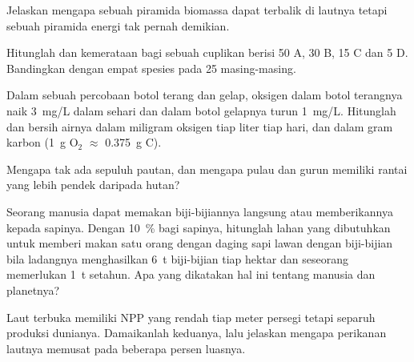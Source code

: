 \begin{exercise}[$\star\star$]\label{exo:b1:ecosystem-organization:6}
Jelaskan mengapa sebuah piramida biomassa dapat terbalik di lautnya
tetapi sebuah piramida energi tak pernah demikian.
\end{exercise}

\begin{exercise}[$\star\star$]\label{exo:b1:ecosystem-organization:7}
Hitunglah  dan kemerataan bagi sebuah cuplikan berisi 50
A, 30 B, 15 C dan 5 D. Bandingkan dengan empat spesies pada 25
masing-masing.
\end{exercise}

\begin{exercise}[$\star\star$]\label{exo:b1:ecosystem-organization:8}
Dalam sebuah percobaan botol terang dan gelap, oksigen dalam botol
terangnya naik \qty{3}{mg/L} dalam sehari dan dalam botol gelapnya
turun \qty{1}{mg/L}. Hitunglah  dan bersih airnya
dalam miligram oksigen tiap liter tiap hari, dan dalam gram karbon
(\qty{1}{g} $\mathrm{O_2}$ $\approx$ \qty{0.375}{g} C).
\end{exercise}

\begin{exercise}[$\star\star$]\label{exo:b1:ecosystem-organization:9}
Mengapa tak ada  sepuluh pautan, dan mengapa pulau dan
gurun memiliki rantai yang lebih pendek daripada hutan?
\end{exercise}

\begin{exercise}[$\star\star\star$]\label{exo:b1:ecosystem-organization:10}
Seorang manusia dapat memakan biji-bijiannya langsung atau
memberikannya kepada sapinya. Dengan  \qty{10}{\%} bagi
sapinya, hitunglah lahan yang dibutuhkan untuk memberi makan satu orang
dengan daging sapi lawan dengan biji-bijian bila ladangnya
menghasilkan \qty{6}{t} biji-bijian tiap hektar dan seseorang
memerlukan \qty{1}{t} setahun. Apa yang dikatakan hal ini tentang  manusia dan  planetnya?
\end{exercise}

\begin{exercise}[$\star\star\star$]\label{exo:b1:ecosystem-organization:11}
Laut terbuka memiliki NPP yang rendah tiap meter persegi tetapi
separuh produksi dunianya. Damaikanlah keduanya, lalu jelaskan mengapa
perikanan lautnya memusat pada beberapa persen luasnya.
\end{exercise}

